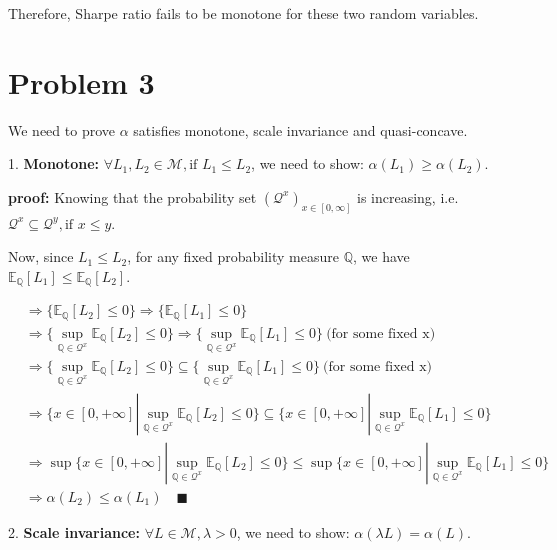\documentclass[letterpaper,11pt]{article}
\begin{document}
\begin{spacing}{1.2}
Therefore, Sharpe ratio fails to be monotone for these two random variables.

\section*{Problem 3}

We need to prove $\alpha$ satisfies monotone, scale invariance and quasi-concave.

1. \textbf{Monotone: } $\forall L_1,L_2 \in \mathcal{M}, \mbox{if } L_1 \le L_2$, we need to show: $\alpha(L_1) \ge \alpha(L_2)$.

\textbf{proof: } Knowing that the probability set $(\mathcal{Q}^x)_{x \in [0,\infty]}$ is increasing, i.e. $\mathcal{Q}^x \subseteq \mathcal{Q}^y, \mbox{if } x \le y$.

Now, since $L_1 \le L_2$, for any fixed probability measure $\mathbb{Q}$, we have $\mathbb{E}_{\mathbb{Q}}[L_1] \le \mathbb{E}_{\mathbb{Q}}[L_2]$.

\begin{equation}
\begin{aligned}
&\Rightarrow \{\mathbb{E}_{\mathbb{Q}}[L_2] \le 0\} \Rightarrow \{\mathbb{E}_{\mathbb{Q}}[L_1] \le 0\} \\
&\Rightarrow \{\sup_{\mathbb{Q} \in \mathcal{Q}^x} \mathbb{E}_{\mathbb{Q}}[L_2] \le 0\} \Rightarrow \{\sup_{\mathbb{Q} \in \mathcal{Q}^x} \mathbb{E}_{\mathbb{Q}}[L_1] \le 0\} \ \mbox{(for some fixed x)}\\
&\Rightarrow \{\sup_{\mathbb{Q} \in \mathcal{Q}^x} \mathbb{E}_{\mathbb{Q}}[L_2] \le 0 \} \subseteq \{\sup_{\mathbb{Q} \in \mathcal{Q}^x} \mathbb{E}_{\mathbb{Q}}[L_1] \le 0 \} \ \mbox{(for some fixed x)}\\
&\Rightarrow \Big \{x \in [0,+\infty] | \sup_{\mathbb{Q} \in \mathcal{Q}^x} \mathbb{E}_{\mathbb{Q}}[L_2] \le 0 \Big \} \subseteq \Big \{ x \in [0,+\infty] | \sup_{\mathbb{Q} \in \mathcal{Q}^x} \mathbb{E}_{\mathbb{Q}}[L_1] \le 0 \Big \} \\
&\Rightarrow \sup \Big \{x \in [0,+\infty] | \sup_{\mathbb{Q} \in \mathcal{Q}^x} \mathbb{E}_{\mathbb{Q}}[L_2] \le 0 \Big \} \le \sup \Big \{ x \in [0,+\infty] | \sup_{\mathbb{Q} \in \mathcal{Q}^x} \mathbb{E}_{\mathbb{Q}}[L_1] \le 0 \Big \} \\
&\Rightarrow \alpha(L_2) \le \alpha(L_1) \quad \blacksquare
\end{aligned}
\end{equation}

2. \textbf{Scale invariance: } $\forall L \in \mathcal{M}, \lambda > 0$, we need to show: $\alpha(\lambda L) = \alpha(L)$.


\end{spacing}
\end{document}
